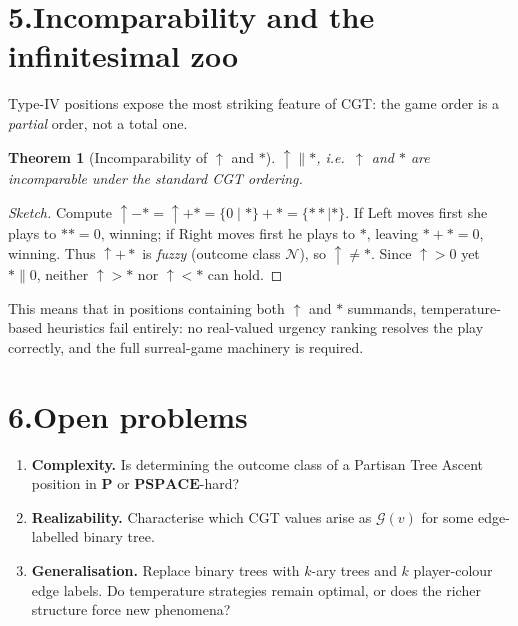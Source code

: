 \documentclass[10pt,twocolumn]{article}
\theoremstyle{plain}
\newtheorem{theorem}{Theorem}
\theoremstyle{definition}
\theoremstyle{remark}
\newcommand{\val}[1]{\mathcal{G}(#1)}
\begin{document}
\section{5.\enspace Incomparability and the infinitesimal zoo}

Type-IV positions expose the most striking feature of CGT: the game
order is a \emph{partial} order, not a total one.

\begin{theorem}[Incomparability of $\uparrow$ and $*$]\label{thm:incomp}
$\uparrow\parallel *$, i.e.\ $\uparrow$ and $*$ are incomparable under
the standard CGT ordering.
\end{theorem}

\begin{proof}[Sketch]
Compute $\uparrow - * = \uparrow + * = \{0\mid *\}+*=\{**\mid *\}$.
If Left moves first she plays to $**=0$, winning; if Right moves first
he plays to $*$, leaving $*+*=0$, winning.  Thus $\uparrow+*$ is
\emph{fuzzy} (outcome class $\mathcal{N}$), so $\uparrow\neq *$.
Since $\uparrow>0$ yet $*\parallel 0$, neither $\uparrow>*$ nor
$\uparrow<*$ can hold.
\end{proof}

This means that in positions containing both $\uparrow$ and $*$ summands,
temperature-based heuristics fail entirely: no real-valued urgency ranking
resolves the play correctly, and the full surreal-game machinery is
required.

\section{6.\enspace Open problems}

\begin{enumerate}[leftmargin=*,topsep=2pt,itemsep=1pt,label=(\roman*)]
\item \textbf{Complexity.} Is determining the outcome class of a
  Partisan Tree Ascent position in $\mathbf{P}$ or $\mathbf{PSPACE}$-hard?
\item \textbf{Realizability.} Characterise which CGT values arise as
  $\val{v}$ for some edge-labelled binary tree.
\item \textbf{Generalisation.} Replace binary trees with $k$-ary trees
  and $k$ player-colour edge labels.  Do temperature strategies remain
  optimal, or does the richer structure force new phenomena?
\end{enumerate}
\end{document}
